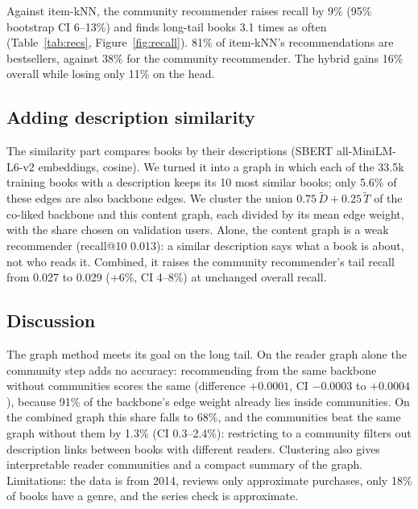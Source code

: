 Against item-kNN, the community recommender raises recall by 9\% (95\%
bootstrap CI 6--13\%) and finds long-tail books 3.1 times as often
(Table~\ref{tab:recs}, Figure~\ref{fig:recall}). 81\% of item-kNN's
recommendations are bestsellers, against 38\% for the community recommender.
The hybrid gains 16\% overall while losing only 11\% on the head.

\subsection{Adding description similarity}
\label{sec:content}
The similarity part compares books by their descriptions (SBERT
all-MiniLM-L6-v2 embeddings, cosine). We turned it into a graph in which each of
the 33.5k training books with a description keeps its 10 most similar books;
only 5.6\% of these edges are also backbone edges. We cluster the union
$0.75\,\tilde{D} + 0.25\,\tilde{T}$ of the co-liked backbone and this content
graph, each divided by its mean edge weight, with the share chosen on
validation users. Alone, the content graph is a weak recommender (recall@10
0.013): a similar description says what a book is about, not who reads it.
Combined, it raises the community recommender's tail recall from 0.027 to 0.029
(+6\%, CI 4--8\%) at unchanged overall recall.

\subsection{Discussion}
The graph method meets its goal on the long tail. On the reader graph alone the
community step adds no accuracy: recommending from the same backbone without
communities scores the same (difference $+0.0001$, CI $-0.0003$ to $+0.0004$),
because 91\% of the backbone's edge weight already lies inside communities. On
the combined graph this share falls to 68\%, and the communities beat the same
graph without them by 1.3\% (CI 0.3--2.4\%): restricting to a community filters
out description links between books with different readers. Clustering also
gives interpretable reader communities and a compact summary of the graph.
Limitations: the data is from 2014, reviews only approximate purchases, only
18\% of books have a genre, and the series check is approximate.

